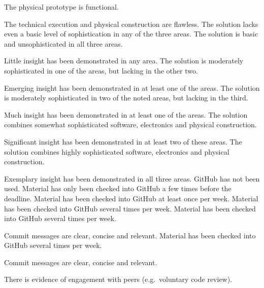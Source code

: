 \documentclass{../fal_assignment}
\begin{document}
\begin{markingrubric}
        \grade The physical prototype is functional.
            \par The technical execution and physical construction are flawless.
        \grade\fail The solution lacks even a basic level of sophistication in any of the three areas.
        \grade The solution is basic and unsophisticated in all three areas.
            \par Little insight has been demonstrated in any area.
        \grade The solution is moderately sophisticated in one of the areas, but lacking in the other two.
            \par Emerging insight has been demonstrated in at least one of the areas.
        \grade The solution is moderately sophisticated in two of the noted areas, but lacking in the third.
            \par Much insight has been demonstrated in at least one of the areas.
        \grade The solution combines somewhat sophisticated software, electronics and physical construction.
            \par Significant insight has been demonstrated in at least two of these areas.
        \grade The solution combines highly sophisticated software, electronics and physical construction.
            \par Exemplary insight has been demonstrated in all three areas.
        \grade\fail GitHub has not been used.
        \grade Material has only been checked into GitHub a few times before the deadline.
        \grade Material has been checked into GitHub at least once per week.
        \grade Material has been checked into GitHub several times per week.
        \grade Material has been checked into GitHub several times per week.
            \par Commit messages are clear, concise and relevant.
        \grade Material has been checked into GitHub several times per week.
            \par Commit messages are clear, concise and relevant.
            \par There is evidence of engagement with peers (e.g.\ voluntary code review).
\end{markingrubric}
\end{document}
